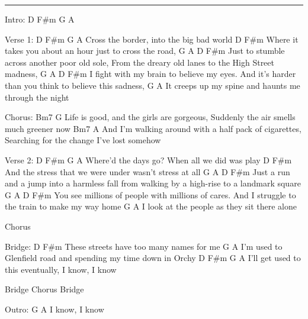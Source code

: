 \noindent\rule{\columnwidth}{1pt}


\begin{lstsong}
Intro: D F#m G A

Verse 1:
D         F#m      G               A
Cross the border, into the big bad world
D                                        F#m
Where it takes you about an hour just to cross the road,
        G                      A                       D                       F#m
Just to stumble across another poor old sole, From the dreary old lanes to the High Street madness,
  G                        A                       D                         F#m
I fight with my brain to believe my eyes. And it's harder than you think to believe this sadness,
   G                                A
It creeps up my spine and haunts me through the night

Chorus:
Bm7                                       G
Life is good, and the girls are gorgeous, Suddenly the air smells much greener now
    Bm7                                                A
And I'm walking around with a half pack of cigarettes, Searching for the change I've lost somehow

Verse 2:
D            F#m         G               A
Where'd the days go? When all we did was play
    D                             F#m
And the stress that we were under wasn't stress at all
       G                     A                  D                           F#m
Just a run and a jump into a harmless fall from walking by a high-rise to a landmark square
    G                           A                        D                        F#m
You see millions of people with millions of cares. And I struggle to the train to make my way home
  G                          A
I look at the people as they sit there alone

Chorus

Bridge:
      D                     F#m
These streets have too many names for me
    G                                   A
I'm used to Glenfield road and spending my time down in Orchy
D                     F#m           G       A
I'll get used to this eventually, I know, I know

Bridge
Chorus
Bridge

Outro:
  G       A
I know, I know
\end{lstsong}
\newpage

